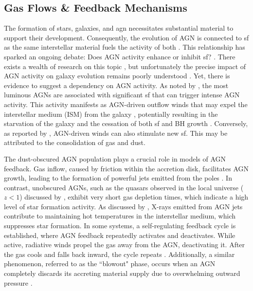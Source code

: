 \subsection{Gas Flows \& Feedback Mechanisms} \label{Sec: Feedback}
The formation of stars, galaxies, and \gls{agn} necessitates substantial material to support their development. Consequently, the evolution of AGN is connected to \gls{sf} as the same interstellar material fuels the activity of both \citep{huang_local_2007, hopkins_cosmological_2008, biviano_spitzer_2011, katsianis_evolution_2017, symeonidis_agn_2021}. This relationship has sparked an ongoing debate: Does AGN activity enhance or inhibit \gls{sf}? \citep{fiore_agn_2017}. There exists a wealth of research on this topic \citep{merloni_synthesis_2008, hopkins_how_2010, schawinski_observational_2007, cicone_massive_2014, reines_relations_2015, kauffmann_host_2003, silk_unleashing_2013, cowley_zfourge_2016}, but unfortunately the precise impact of AGN activity on galaxy evolution remains poorly understood \citep{fiore_agn_2017}. Yet, there is evidence to suggest a dependency on AGN activity. As noted by \cite{hopkins_cosmological_2008}, the most luminous AGNs are associated with significant \gls{sf} that can trigger intense AGN activity. This activity manifests as AGN-driven outflow winds that may expel the interstellar medium (ISM) from the galaxy \citep{fiore_agn_2017, schawinski_observational_2007, cicone_massive_2014}, potentially resulting in the starvation of the galaxy and the cessation of both \gls{sf} and BH growth \citep{hopkins_how_2010}. Conversely, as reported by \cite{silk_unleashing_2013}, AGN-driven winds can also stimulate new \gls{sf}. This may be attributed to the consolidation of gas and dust. 

The dust-obscured AGN population plays a crucial role in models of AGN feedback. Gas inflow, caused by friction within the accretion disk, facilitates AGN growth, leading to the formation of powerful jets emitted from the poles \citep{hickox_obscured_2018}. In contrast, unobscured AGNs, such as the quasars observed in the local universe ($z<1$) discussed by \cite{frias_castillo_at_2024}, exhibit very short gas depletion times, which indicate a high level of star formation activity. As discussed by \cite{mcnamara_heating_2007}, X-rays emitted from AGN jets contribute to maintaining hot temperatures in the interstellar medium, which suppresses star formation. In some systems, a self-regulating feedback cycle is established, where AGN feedback repeatedly activates and deactivates. While active, radiative winds propel the gas away from the AGN, deactivating it. After the gas cools and falls back inward, the cycle repeats \citep{heckman_coevolution_2014}. Additionally, a similar phenomenon, referred to as the ``blowout" phase, occurs when an AGN completely discards its accreting material supply due to overwhelming outward pressure \citep{hickox_obscured_2018}.


